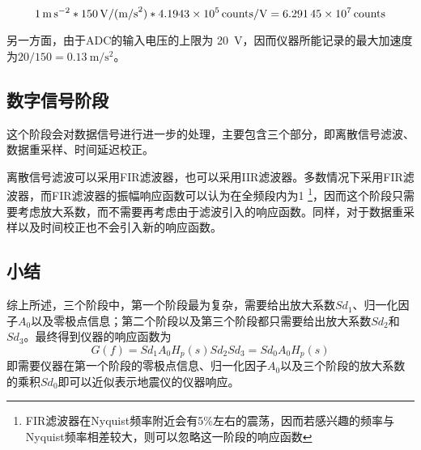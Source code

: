 \[
    \SI{1}{\m\per\square\s} *
    \SI{150}{\V\per{(\m\per\square\s)}} *
    \SI{4.1943e5}{counts\per\V} =
    \SI{6.29145e7}{counts}
\]

另一方面，由于ADC的输入电压的上限为 \SI{20}{\V}，因而仪器所能记录的最大加速度为$20/150=\SI{0.13}{\m\per\square\s}$。

\subsection{数字信号阶段}
这个阶段会对数据信号进行进一步的处理，主要包含三个部分，即离散信号滤波、数据重采样、时间延迟校正。

离散信号滤波可以采用FIR滤波器，也可以采用IIR滤波器。多数情况下采用FIR滤波器，而FIR滤波器的振幅响应函数可以认为在全频段内为1
\footnote{FIR滤波器在Nyquist频率附近会有5\%左右的震荡，因而若感兴趣的频率与Nyquist频率相差较大，则可以忽略这一阶段的响应函数}，因而这个阶段只需要考虑放大系数，而不需要再考虑由于滤波引入的响应函数。同样，对于数据重采样以及时间校正也不会引入新的响应函数。

\subsection{小结}
综上所述，三个阶段中，第一个阶段最为复杂，需要给出放大系数$Sd_{1}$、归一化因子$A_0$以及零极点信息；第二个阶段以及第三个阶段都只需要给出放大系数$Sd_{2}$和$Sd_3$。最终得到仪器的响应函数为
\[
    G(f)=Sd_1 A_0 H_p(s) Sd_2 Sd_3=Sd_0 A_0 H_p(s)
\]
即需要仪器在第一个阶段的零极点信息、归一化因子$A_0$以及三个阶段的放大系数的乘积$Sd_0$即可以近似表示地震仪的仪器响应。
